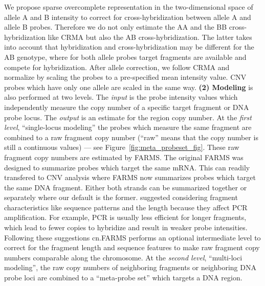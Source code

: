 \documentclass[article]{bioinf}
\begin{document}
We propose sparse overcomplete representation in the two-dimensional 
space of allele A and B intensity to correct for cross-hybridization between 
allele A and allele B probes. Therefore we do not only estimate the AA and the BB
cross-hybridization like CRMA \citep{Bengtsson:08} but also the AB cross-hybridization. The
latter takes into account that hybridization and cross-hybridization
may be different for the AB genotype, where for both allele probes 
target fragments are available and compete for hybridization. 
After allele correction, we follow CRMA and normalize by scaling the probes
to a pre-specified mean intensity value. CNV probes which have only one
allele are scaled in the same way. \linebreak 
{\bf(2) Modeling} is also performed at two levels.
The {\em input} is the probe intensity values which 
independently measure the copy number of a specific target fragment or
DNA probe locus.
The {\em output} is an estimate for the region copy number.
At the {\em first level}, ``single-locus modeling'' the probes which
measure the same fragment are combined to a raw fragment copy number (``raw''
means that the copy number is still a continuous values) --- 
see Figure~\ref{fig:meta_probeset_fig}. These raw fragment
  copy numbers are estimated by FARMS. 
The original FARMS was designed to
summarize probes which target the same mRNA. This can readily
transfered to CNV analysis where FARMS now summarizes probes which
target the same DNA fragment. Either both strands can be
summarized together or separately where our default is the former.
\cite{Nannya:05} suggested considering
fragment characteristics  like sequence patterns and the length because
they affect PCR amplification.
For example, PCR is usually less efficient for  
longer fragments, which lead to fewer copies to hybridize and
result in weaker probe intensities.
Following these suggestions cn.FARMS performs an optional intermediate 
level to correct for the fragment length and sequence features to  
make raw fragment copy numbers comparable along the
chromosome.
At the {\em second level}, ``multi-loci modeling'', the raw copy numbers
of neighboring fragments or neighboring  DNA probe loci
are combined to a ``meta-probe set'' which
targets a DNA region. 
\end{document}

